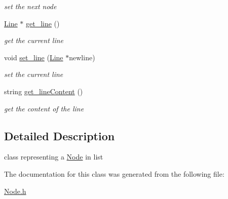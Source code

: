 \begin{DoxyCompactItemize}
\begin{DoxyCompactList}\small\item\em set the next node \item\end{DoxyCompactList}\item 
\hypertarget{classNode_a148767567f75e6d3e5e8f8ff9e438336}{
\hyperlink{classLine}{Line} $\ast$ \hyperlink{classNode_a148767567f75e6d3e5e8f8ff9e438336}{get\_\-line} ()}
\label{classNode_a148767567f75e6d3e5e8f8ff9e438336}

\begin{DoxyCompactList}\small\item\em get the current line \item\end{DoxyCompactList}\item 
\hypertarget{classNode_acb0fcb0970c2e2efd9ec90133ea8d236}{
void \hyperlink{classNode_acb0fcb0970c2e2efd9ec90133ea8d236}{set\_\-line} (\hyperlink{classLine}{Line} $\ast$newline)}
\label{classNode_acb0fcb0970c2e2efd9ec90133ea8d236}

\begin{DoxyCompactList}\small\item\em set the current line \item\end{DoxyCompactList}\item 
\hypertarget{classNode_a97c6b9e99919926b82b33444883754f1}{
string \hyperlink{classNode_a97c6b9e99919926b82b33444883754f1}{get\_\-lineContent} ()}
\label{classNode_a97c6b9e99919926b82b33444883754f1}

\begin{DoxyCompactList}\small\item\em get the content of the line \item\end{DoxyCompactList}\end{DoxyCompactItemize}


\subsection{Detailed Description}
class representing a \hyperlink{classNode}{Node} in list 

The documentation for this class was generated from the following file:\begin{DoxyCompactItemize}
\item 
\hyperlink{Node_8h}{Node.h}\end{DoxyCompactItemize}
